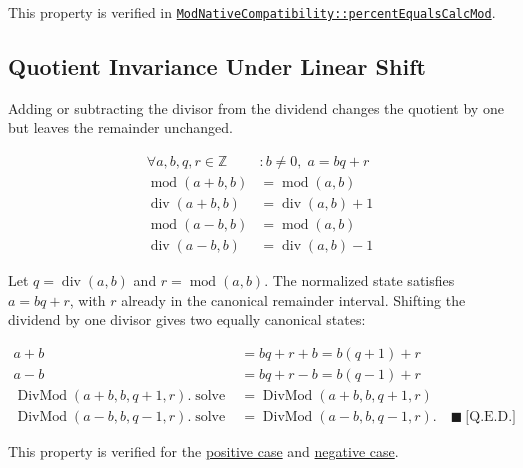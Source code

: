 This property is verified in
\href{https://github.com/thiagomata/prime-numbers/blob/modulo-article-v1.0.0/src/main/scala/v1/chapter2/div/properties/ModNativeCompatibility.scala#percentEqualsCalcMod}{\texttt{ModNativeCompatibility::percentEqualsCalcMod}}.

\subsection{Quotient Invariance Under Linear Shift}
\label{sec:linear-shift}

Adding or subtracting the divisor from the dividend changes the quotient by
one but leaves the remainder unchanged.

\begin{equation*}
\begin{aligned}
\forall a,b,q,r \in \mathbb{Z} &: b \neq 0,\; a = bq + r \\
\operatorname{mod}(a + b, b) &= \operatorname{mod}(a, b) \\
\operatorname{div}(a + b, b) &= \operatorname{div}(a, b) + 1 \\
\operatorname{mod}(a - b, b) &= \operatorname{mod}(a, b) \\
\operatorname{div}(a - b, b) &= \operatorname{div}(a, b) - 1
\end{aligned}
\end{equation*}

Let $q=\operatorname{div}(a,b)$ and $r=\operatorname{mod}(a,b)$. The
normalized state satisfies $a=bq+r$, with $r$ already in the canonical
remainder interval. Shifting the dividend by one divisor gives two equally
canonical states:

\begin{equation*}
\begin{aligned}
a+b &= bq+r+b = b(q+1)+r \\
a-b &= bq+r-b = b(q-1)+r \\
\operatorname{DivMod}(a+b,b,q+1,r).\operatorname{solve}
  &= \operatorname{DivMod}(a+b,b,q+1,r) \\
\operatorname{DivMod}(a-b,b,q-1,r).\operatorname{solve}
  &= \operatorname{DivMod}(a-b,b,q-1,r).
  \quad \blacksquare\ \text{[Q.E.D.]}
\end{aligned}
\end{equation*}

This property is verified for the
\href{https://github.com/thiagomata/prime-numbers/blob/modulo-article-v1.0.0/src/main/scala/v1/chapter2/div/properties/AdditionAndMultiplication.scala#APlusBSameModPlusDiv}{positive case}
and
\href{https://github.com/thiagomata/prime-numbers/blob/modulo-article-v1.0.0/src/main/scala/v1/chapter2/div/properties/AdditionAndMultiplication.scala#ALessBSameModDecreaseDiv}{negative case}.


